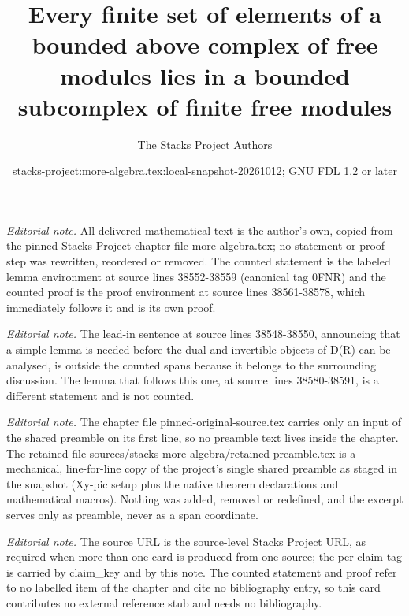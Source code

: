 \documentclass[10pt,a4paper]{amsart}
\title{Every finite set of elements of a bounded above complex of free modules lies in a bounded subcomplex of finite free modules}
\author{The Stacks Project Authors}
\date{stacks-project:more-algebra.tex:local-snapshot-20261012; GNU FDL 1.2 or later}
\theoremstyle{plain}
\theoremstyle{definition}
\theoremstyle{remark}
\numberwithin{equation}{subsection}
\begin{document}
\maketitle
\setcounter{subsection}{1}
\noindent\textit{Editorial note.} All delivered mathematical text is the author's own, copied from the pinned Stacks Project chapter file more-algebra.tex; no statement or proof step was rewritten, reordered or removed. The counted statement is the labeled lemma environment at source lines 38552-38559 (canonical tag 0FNR) and the counted proof is the proof environment at source lines 38561-38578, which immediately follows it and is its own proof.\par\medskip
\noindent\textit{Editorial note.} The lead-in sentence at source lines 38548-38550, announcing that a simple lemma is needed before the dual and invertible objects of D(R) can be analysed, is outside the counted spans because it belongs to the surrounding discussion. The lemma that follows this one, at source lines 38580-38591, is a different statement and is not counted.\par\medskip
\noindent\textit{Editorial note.} The chapter file pinned-original-source.tex carries only an input of the shared preamble on its first line, so no preamble text lives inside the chapter. The retained file sources/stacks-more-algebra/retained-preamble.tex is a mechanical, line-for-line copy of the project's single shared preamble as staged in the snapshot (Xy-pic setup plus the native theorem declarations and mathematical macros). Nothing was added, removed or redefined, and the excerpt serves only as preamble, never as a span coordinate.\par\medskip
\noindent\textit{Editorial note.} The source URL is the source-level Stacks Project URL, as required when more than one card is produced from one source; the per-claim tag is carried by claim\_key and by this note. The counted statement and proof refer to no labelled item of the chapter and cite no bibliography entry, so this card contributes no external reference stub and needs no bibliography.\par\medskip
\end{document}
